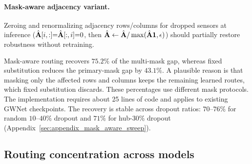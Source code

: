 \paragraph{Mask-aware adjacency variant.}
Zeroing and renormalizing adjacency rows/columns for dropped sensors at
inference ($\hat{\mathbf{A}}[i,:]{=}\hat{\mathbf{A}}[:,i]{=}0$, then
$\hat{\mathbf{A}} \leftarrow \hat{\mathbf{A}} / \max(\hat{\mathbf{A}}\mathbf{1}, \epsilon)$) should
partially restore robustness without retraining.

\begin{table}[H]
\centering
\caption{\textbf{Mask-aware routing reduces GWNet's multi-mask dropout gap.}\space
Dropped-sensor rows/columns are zeroed and renormalized; each of 3 seeds is
averaged over 5 random 30\% masks. Error bars summarize the seed means;
recovery is the mean of per-seed recovery ratios.}
\label{tab:mask_aware}
\vskip 0.05in
\small

\end{table}

Mask-aware routing recovers $75.2\%$ of the multi-mask gap, whereas fixed
substitution reduces the primary-mask gap by $43.1\%$. A plausible reason is
that masking only the affected rows and columns keeps the remaining learned
routes, which fixed substitution discards. These percentages use different
mask protocols. The implementation requires about 25 lines of code and applies to existing GWNet checkpoints. The recovery is stable across
dropout ratios: $70$--$76\%$ for random $10$--$40\%$ dropout and $71\%$ for
hub-30\% dropout (Appendix~\ref{sec:appendix_mask_aware_sweep}).

\subsection{Routing concentration across models}
\label{sec:routing_spectrum}

